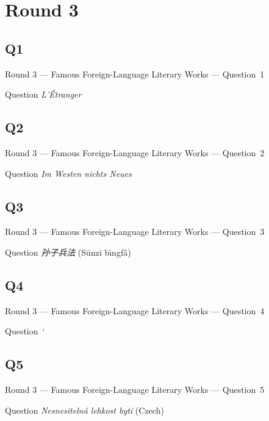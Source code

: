\documentclass[11pt]{beamer}
\begin{document}
\section{Round 3}
\subsection*{Q1}
\begin{frame}[t]{Round 3 --- Famous Foreign-Language Literary Works --- \mbox{Question 1}}
    \vspace{-0.5em}
    \begin{block}{Question}
        \emph{L'Étranger}
    \end{block}
\end{frame}
\subsection*{Q2}
\begin{frame}[t]{Round 3 --- Famous Foreign-Language Literary Works --- \mbox{Question 2}}
    \vspace{-0.5em}
    \begin{block}{Question}
        \emph{Im Westen nichts Neues}
    \end{block}
\end{frame}
\subsection*{Q3}
\begin{frame}[t]{Round 3 --- Famous Foreign-Language Literary Works --- \mbox{Question 3}}
    \vspace{-0.5em}
    \begin{block}{Question}
        \emph{孙子兵法} (S\=unzi b\={\i}ngf\v a)
    \end{block}
\end{frame}
\subsection*{Q4}
\begin{frame}[t]{Round 3 --- Famous Foreign-Language Literary Works --- \mbox{Question 4}}
    \vspace{-0.5em}
    \begin{block}{Question}
        \emph{`\textIota\textlambda\textiota\textalpha\textvarsigma{}}
    \end{block}
\end{frame}
\subsection*{Q5}
\begin{frame}[t]{Round 3 --- Famous Foreign-Language Literary Works --- \mbox{Question 5}}
    \vspace{-0.5em}
    \begin{block}{Question}
        \emph{Nesnesitelná lehkost bytí} (Czech)
    \end{block}
\end{frame}
\end{document}
